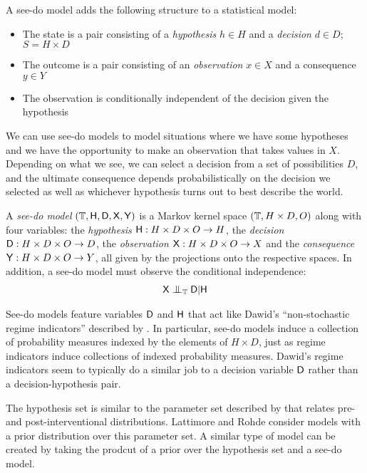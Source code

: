 A see-do model adds the following structure to a statistical model:

\begin{itemize}
    \item The state is a pair consisting of a \emph{hypothesis} $h\in H$ and a \emph{decision} $d\in D$; $S=H\times D$
    \item The outcome is a pair consisting of an \emph{observation} $x\in X$ and a consequence $y\in Y$
    \item The observation is conditionally independent of the decision given the hypothesis
\end{itemize}

We can use see-do models to model situations where we have some hypotheses and we have the opportunity to make an observation that takes values in $X$. Depending on what we see, we can select a decision from a set of possibilities $D$, and the ultimate consequence depends probabilistically on the decision we selected as well as whichever hypothesis turns out to best describe the world.

\begin{definition}
A \emph{see-do model} $(\mathbb{T},\mathsf{H},\mathsf{D},\mathsf{X},\mathsf{Y})$ is a Markov kernel space $(\mathbb{T},H\times D, O)$ along with four variables: the \emph{hypothesis} $\mathsf{H}:H\times D\times O\to H$, the \emph{decision} $\mathsf{D}:H\times D\times O\to D$, the \emph{observation} $\mathsf{X}: H\times D\times O\to X$ and the \emph{consequence} $\mathsf{Y}:H\times D\times O\to Y$, all given by the projections onto the respective spaces. In addition, a see-do model must observe the conditional independence:
\begin{align}
\RV{X}\CI_\kernel{T} \RV{D}|\RV{H} \label{eq:see_do_independence_requirement}
\end{align}
\end{definition}

See-do models feature variables $\mathsf{D}$ and $\mathsf{H}$ that act like Dawid's ``non-stochastic regime indicators'' described by \citet{dawid_influence_2002,dawid_decision-theoretic_2012,dawid_decision-theoretic_2020}. In particular, see-do models induce a collection of probability measures indexed by the elements of $H\times D$, just as regime indicators induce collections of indexed probability measures. Dawid's regime indicators seem to typically do a similar job to a decision variable $\mathsf{D}$ rather than a decision-hypothesis pair.

The hypothesis set is similar to the parameter set described by \citet{lattimore_replacing_2019} that relates pre- and post-interventional distributions. Lattimore and Rohde consider models with a prior distribution over this parameter set. A similar type of model can be created by taking the prodcut of a prior over the hypothesis set and a see-do model. 


